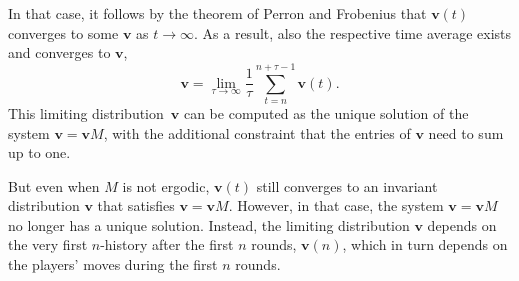 \documentclass[11pt]{article}
\theoremstyle{plainCl1}
\theoremstyle{plainCl2}
\begin{document}
In that case, it follows by the theorem of Perron and Frobenius that $\mathbf{v}(t)$ converges to some $\mathbf{v}$ as $t\to \infty$. 
As a result, also the respective time average exists and converges to $\mathbf{v}$,
\begin{equation} \label{Eq:TimeAverage}
\mathbf{v} = \lim_{\tau\to\infty} \frac{1}{\tau} \sum_{t=n}^{n+\tau-1} \mathbf{v}(t).  
\end{equation}
This limiting distribution~$\mathbf{v}$ can be computed as the unique solution of the system $\mathbf{v} \!=\! \mathbf{v}M$, with the additional constraint that the entries of $\mathbf{v}$ need to sum up to one. 

But even when $M$ is not ergodic, $\mathbf{v}(t)$ still converges to an invariant distribution $\mathbf{v}$ that satisfies $\mathbf{v} \!=\! \mathbf{v}M$.
However, in that case, the system  $\mathbf{v} \!=\! \mathbf{v}M$ no longer has a unique solution. 
Instead, the limiting distribution $\mathbf{v}$ depends on the very first $n$-history after the first $n$ rounds, $\mathbf{v}(n)$, which in turn depends on the players' moves during the first $n$ rounds.\\ 

\end{document}
